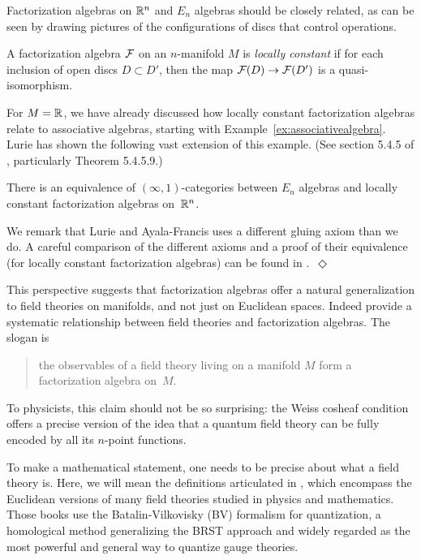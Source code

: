 \documentclass[11pt]{amsart}
\begin{document}
Factorization algebras on $\mathbb R^n$ and $E_n$ algebras should be closely related,
as can be seen by drawing pictures of the configurations of discs that control operations.

\begin{dfn}
A factorization algebra $\mathcal F$ on an $n$-manifold $M$ is \emph{locally constant} if for each inclusion of open discs $D \subset D'$, then the map $\mathcal F(D) \to \mathcal F(D')$ is a quasi-isomorphism.
\end{dfn}

For $M = \mathbb R$, we have already discussed how locally constant factorization algebras relate to associative algebras, starting with Example~\ref{ex:associativealgebra}.
Lurie has shown the following vast extension of this example. (See section 5.4.5 of \cite{LurieHA}, particularly Theorem 5.4.5.9.)

\begin{thm}\label{thm:locisen}
There is an equivalence of $(\infty,1)$-categories between $E_n$ algebras and locally constant factorization algebras on~$\mathbb R^n$.  
\end{thm}  

\begin{rmk}
We remark that Lurie and Ayala-Francis uses a different gluing axiom than we do. A careful comparison of the different axioms and a proof of their equivalence (for locally constant factorization algebras) can be found in \cite{Matsuoka}.~\hfill $\Diamond$
\end{rmk}

This perspective suggests that factorization algebras offer a natural generalization to field theories on manifolds, and not just on Euclidean spaces. Indeed \cite{CG1, CG2} provide a systematic relationship between field theories and factorization algebras.
The slogan is 
\begin{quote}
the observables of a field theory living on a manifold $M$ form a factorization algebra on~$M$. 
\end{quote}
To physicists, this claim should not be so surprising:
the Weiss cosheaf condition offers a precise version of the idea that a quantum field theory can be fully encoded by all its $n$-point functions.

To make a mathematical statement, one needs to be precise about what a field theory is.
Here, we will mean the definitions articulated in \cite{CosBook,CG1, CG2}, which encompass the Euclidean versions of many field theories studied in physics and mathematics.
Those books use the Batalin-Vilkovisky (BV) formalism for quantization, a homological method generalizing the BRST approach and widely regarded as the most powerful and general way to quantize gauge theories. 
\end{document}
